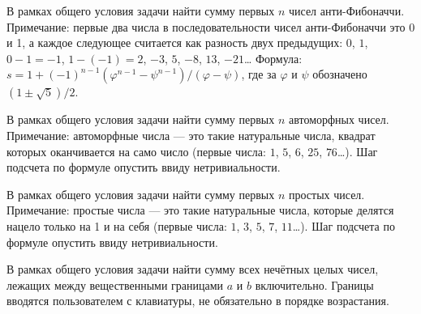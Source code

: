 
\begin{zztask}
В рамках общего условия задачи найти сумму первых $n$ чисел анти-Фибоначчи.
Примечание: первые
два числа в последовательности чисел анти-Фибоначчи это 0 и 1, а каждое
следующее считается как разность двух предыдущих: $0$, $1$, $0-1=-1$,
$1-(-1)=2$, $-3$, $5$, $-8$, $13$, $-21$\dots
Формула: $s = 1+(-1)^{n-1}(\varphi^{n-1}-\psi^{n-1})/(\varphi-\psi)$, где за $\varphi$
и $\psi$ обозначено $(1\pm\sqrt5)/2$.
\end{zztask}


\begin{zztask}
В рамках общего условия задачи найти сумму первых $n$ автоморфных чисел.
Примечание:
автоморфные числа --- это такие натуральные числа, квадрат которых
оканчивается на само число (первые числа: $1$, $5$, $6$, $25$, $76$\dots).
Шаг подсчета по формуле опустить ввиду нетривиальности.  
\end{zztask}


\begin{zztask}
В рамках общего условия задачи найти сумму первых $n$ простых чисел.
Примечание: простые
числа --- это такие натуральные числа, которые делятся нацело только на 1 и
на себя (первые числа: $1$, $3$, $5$, $7$, $11$\dots).
Шаг подсчета по формуле опустить ввиду нетривиальности.
\end{zztask}


\begin{zztask}
В рамках общего условия задачи найти сумму всех нечётных целых чисел,
лежащих между вещественными границами $a$ и $b$ включительно. Границы вводятся
пользователем с клавиатуры, не обязательно в порядке возрастания.
\end{zztask}


